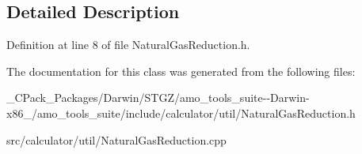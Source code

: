 \subsection{Detailed Description}


Definition at line 8 of file Natural\+Gas\+Reduction.\+h.



The documentation for this class was generated from the following files\+:\begin{DoxyCompactItemize}
\item 
\+\_\+\+C\+Pack\+\_\+\+Packages/\+Darwin/\+S\+T\+G\+Z/amo\+\_\+tools\+\_\+suite-\/-\/\+Darwin-\/x86\+\_/amo\+\_\+tools\+\_\+suite/include/calculator/util/Natural\+Gas\+Reduction.\+h\item 
src/calculator/util/Natural\+Gas\+Reduction.\+cpp\end{DoxyCompactItemize}
